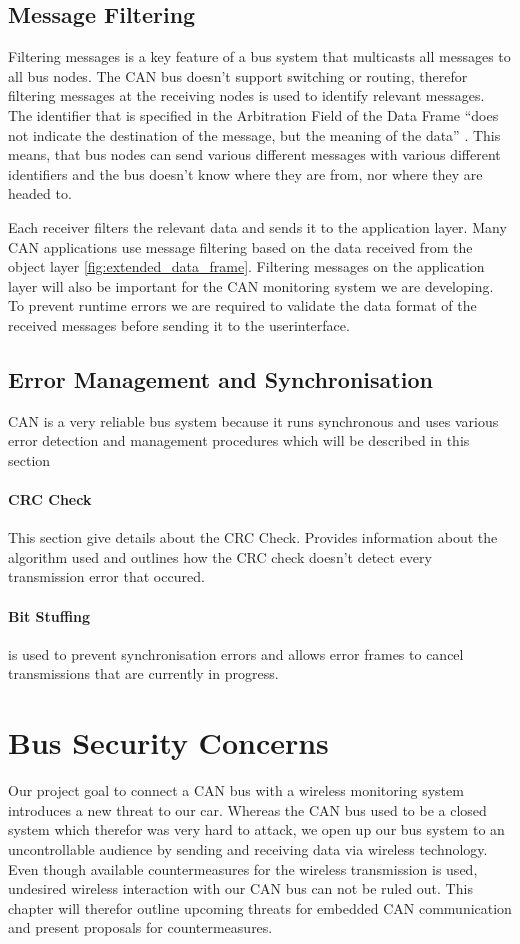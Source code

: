 	\subsection{Message Filtering}
	Filtering messages is a key feature of a bus system that
	multicasts all messages to all bus nodes. The CAN bus doesn't support switching
	or routing, therefor filtering messages at the receiving nodes is used to
	identify relevant messages. The identifier that is specified in the Arbitration
	Field of the Data Frame ``does not indicate the destination of the message, but
	the meaning of the data'' \cite{can2spec}. This means, that bus nodes can send
	various different messages with various different identifiers and the bus doesn't know
	where they are from, nor where they are headed to. 
	
	Each receiver filters the
	relevant data and sends it to the application layer. Many CAN applications use
	message filtering based on the data received from the object
	layer \autoref{fig:extended_data_frame}.
	Filtering messages on the application layer will also be important for the CAN
	monitoring system we are developing. To prevent runtime errors we are required
	to validate the data format of the received messages before sending it to the
	userinterface.
	
	
		
	\subsection{Error Management and Synchronisation}
	CAN is a very reliable bus system because it runs synchronous and uses various
	error detection and management procedures which will be described in this
	section
	
	\paragraph{CRC Check}
	This section give details about the CRC Check. Provides information about the
	algorithm used and outlines how the CRC check doesn't detect every transmission
	error that occured.
	
	\paragraph{Bit Stuffing}
	is used to prevent synchronisation errors and allows error frames
	to cancel transmissions that are currently in progress.

\section{Bus Security Concerns} 
Our project goal to connect a CAN bus with a wireless monitoring system
introduces a new threat to our car. Whereas the CAN bus used to be a closed
system which therefor was very hard to attack, we open up our bus
system to an uncontrollable audience by sending and receiving data via wireless
technology. Even though available countermeasures for the wireless
transmission is used, undesired wireless interaction with our CAN bus can not be
ruled out. This chapter will therefor outline upcoming threats for embedded CAN
communication and present proposals for countermeasures.

